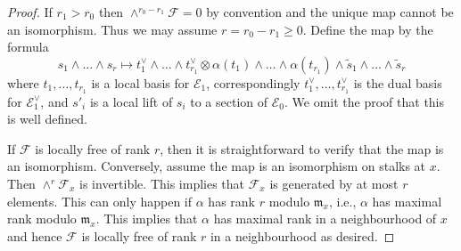 \documentclass[10pt,a4paper]{amsart}
\theoremstyle{plain}
\theoremstyle{definition}
\theoremstyle{remark}
\numberwithin{equation}{subsection}
\begin{document}
\begin{proof}
If $r_1 > r_0$ then $\wedge^{r_0 - r_1}\mathcal{F} = 0$ by convention
and the unique map cannot be an isomorphism. Thus we may assume
$r = r_0 - r_1 \geq 0$. Define the map by the formula
$$
s_1 \wedge \ldots \wedge s_r \mapsto
t_1^\vee \wedge \ldots \wedge t_{r_1}^\vee \otimes
\alpha(t_1) \wedge \ldots \wedge \alpha(t_{r_1}) \wedge
\tilde s_1 \wedge \ldots \wedge \tilde s_r
$$
where $t_1, \ldots, t_{r_1}$ is a local basis for $\mathcal{E}_1$,
correspondingly
$t_1^\vee, \ldots, t_{r_1}^\vee$ is the dual basis for $\mathcal{E}_1^\vee$,
and $s'_i$ is a local lift of $s_i$ to a section of $\mathcal{E}_0$.
We omit the proof that this is well defined.

\medskip\noindent
If $\mathcal{F}$ is locally free of rank $r$, then it is straightforward
to verify that the map is an isomorphism. Conversely, assume the map
is an isomorphism on stalks at $x$. Then $\wedge^r\mathcal{F}_x$
is invertible. This implies that $\mathcal{F}_x$ is generated by
at most $r$ elements. This can only happen if $\alpha$ has rank
$r$ modulo $\mathfrak m_x$, i.e., $\alpha$ has maximal rank modulo
$\mathfrak m_x$. This implies that $\alpha$ has maximal rank
in a neighbourhood of $x$ and hence $\mathcal{F}$ is locally free
of rank $r$ in a neighbourhood as desired.
\end{proof}
\end{document}
